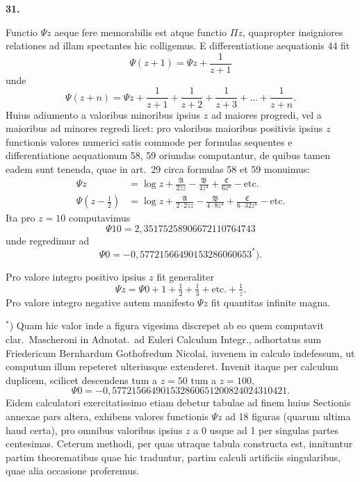 \documentclass[12pt,a4paper]{article}
\newcommand{\art}[1]{\par\medskip\noindent\textbf{#1.}\par\nopagebreak\smallskip}
\begin{document}
\art{31}

Functio $\Psi z$ aeque fere memorabilis est atque functio $\Pi z$, quapropter insigniores relationes ad illam spectantes hic colligemus. E differentiatione aequationis 44 fit
\begin{equation}
\Psi(z+1) = \Psi z + \frac{1}{z+1}\tag{[63]}
\end{equation}
unde
\begin{equation}
\Psi(z+n) = \Psi z + \frac{1}{z+1} + \frac{1}{z+2} + \frac{1}{z+3} + \ldots + \frac{1}{z+n}.\tag{[64]}
\end{equation}
Huius adiumento a valoribus minoribus ipsius $z$ ad maiores progredi, vel a maioribus ad minores regredi licet: pro valoribus maioribus positivis ipsius $z$ functionis valores numerici satis commode per formulas sequentes e differentiatione aequationum 58, 59 oriundas computantur, de quibus tamen eadem sunt tenenda, quae in art.\ 29 circa formulas 58 et 59 monuimus:
\begin{align}
\Psi z &= \log z + \frac{\mathfrak{A}}{2zz} - \frac{\mathfrak{B}}{4z^4} + \frac{\mathfrak{C}}{6z^6} - \text{etc.}\tag{[65]}\\
\Psi(z-\tfrac{1}{2}) &= \log z + \frac{\mathfrak{A}}{2\cdot2zz} - \frac{\mathfrak{B}}{4\cdot8z^4} + \frac{\mathfrak{C}}{6\cdot32z^6} - \text{etc.}\tag{[66]}
\end{align}
Ita pro $z=10$ computavimus
\[
\Psi10 = 2{,}35175258906672110764743
\]
unde regredimur ad
\[
\Psi0 = -0{,}57721566490153286060653^*).
\]

Pro valore integro positivo ipsius $z$ fit generaliter
\begin{equation}
\Psi z = \Psi0 + 1 + \tfrac{1}{2} + \tfrac{1}{3} + \text{etc.} + \tfrac{1}{z}.\tag{[67]}
\end{equation}
Pro valore integro negative autem manifesto $\Psi z$ fit quantitas infinite magna.

\vspace{0.5em}
\noindent$^*$) Quam hic valor inde a figura vigesima discrepet ab eo quem computavit clar.\ Mascheroni in Adnotat.\ ad Euleri Calculum Integr., adhortatus sum Friedericum Bernhardum Gothofredum Nicolai, iuvenem in calculo indefessum, ut computum illum repeteret ulteriusque extenderet. Invenit itaque per calculum duplicem, scilicet descendens tum a $z=50$ tum a $z=100$,
\[
\Psi0 = -0{,}577215664901532860651200824024310421.
\]
Eidem calculatori exercitatissimo etiam debetur tabulae ad finem huius Sectionis annexae pars altera, exhibens valores functionis $\Psi z$ ad 18 figuras (quarum ultima haud certa), pro omnibus valoribus ipsius $z$ a 0 usque ad 1 per singulas partes centesimas. Ceterum methodi, per quas utraque tabula constructa est, innituntur partim theorematibus quae hic traduntur, partim calculi artificiis singularibus, quae alia occasione proferemus.
\end{document}
